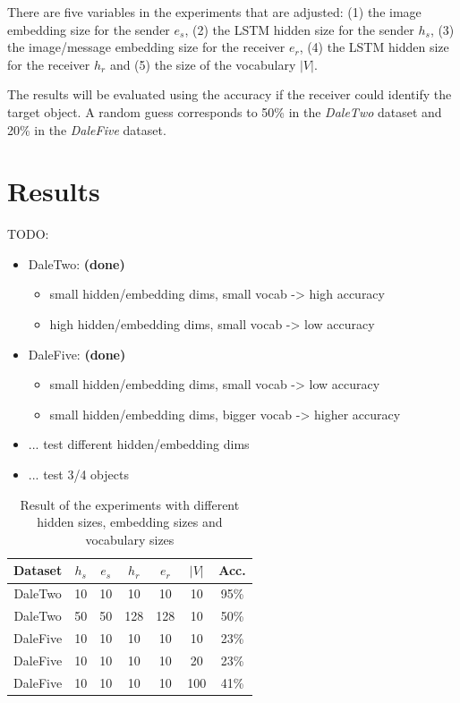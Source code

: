 \documentclass[11pt]{article}
\begin{document}
There are five variables in the experiments that are adjusted: (1) the image embedding size for the sender $e_s$, (2) the LSTM hidden size for the sender $h_s$, (3) the image/message embedding size for the receiver $e_r$, (4) the LSTM hidden size for the receiver $h_r$ and (5) the size of the vocabulary $|V|$.

The results will be evaluated using the accuracy if the receiver could identify the target object. A random guess corresponds to 50\% in the \emph{DaleTwo} dataset and 20\% in the \emph{DaleFive} dataset.

\section{Results}
TODO:
\begin{itemize}
  \item DaleTwo: \textbf{(done)}
        \begin{itemize}
          \item small hidden/embedding dims, small vocab -> high accuracy
          \item high hidden/embedding dims, small vocab -> low accuracy
        \end{itemize}
  \item DaleFive: \textbf{(done)}
        \begin{itemize}
          \item small hidden/embedding dims, small vocab -> low accuracy
          \item small hidden/embedding dims, bigger vocab -> higher accuracy
        \end{itemize}
  \item ... test different hidden/embedding dims
  \item ... test 3/4 objects
\end{itemize}

\begin{table}
  \centering
  \begin{tabular}{c|ccccc|c}
    \hline
    \textbf{Dataset} & $h_{s}$ & $e_{s}$ & $h_{r}$ & $e_{r}$ & $|V|$ & \textbf{Acc.} \\
    \hline
    DaleTwo          & {10}    & {10}    & {10}    & {10}    & {10}  & {95\%}        \\
    DaleTwo          & {50}    & {50}    & {128}   & {128}   & {10}  & {50\%}        \\
    DaleFive         & {10}    & {10}    & {10}    & {10}    & {10}  & {23\%}        \\
    DaleFive         & {10}    & {10}    & {10}    & {10}    & {20}  & {23\%}        \\
    DaleFive         & {10}    & {10}    & {10}    & {10}    & {100} & {41\%}        \\
    \hline
  \end{tabular}
  \caption{Result of the experiments with different hidden sizes, embedding sizes and vocabulary sizes}
  \label{tab:results}
\end{table}
\end{document}
